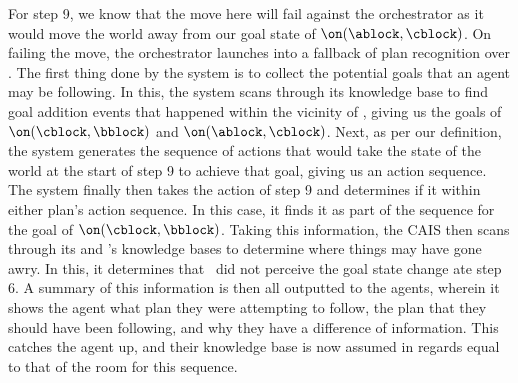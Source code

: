 For step 9, we know that the move here will fail against the orchestrator as it
would move the world away from our goal state of $\on(\ablock, \cblock)$. On
failing the move, the orchestrator launches into a fallback of plan recognition
over \humanb. The first thing done by the system is to collect the potential goals
that an agent may be following. In this, the system scans through its knowledge base
to find goal addition events that happened within the vicinity of \humanb, giving
us the goals of $\on(\cblock, \bblock)$ and $\on(\ablock, \cblock)$. Next, as per
our definition, the system generates the sequence of actions that would take the
state of the world at the start of step 9 to achieve that goal, giving us an
action sequence. The system finally then takes the action of step 9 and determines
if it within either plan's action sequence. In this case, it finds it as part of
the sequence for the goal of $\on(\cblock, \bblock)$. Taking this information, the
CAIS then scans through its and \humanb's knowledge bases to determine where things
may have gone awry. In this, it determines that \humanb\ did not perceive the goal
state change ate step 6. A summary of this information is then all outputted to the
agents, wherein it shows the agent what plan they were attempting to follow, the plan
that they should have been following, and why they have a difference of information.
This catches the agent up, and their knowledge base is now assumed in regards equal
to that of the room for this sequence.